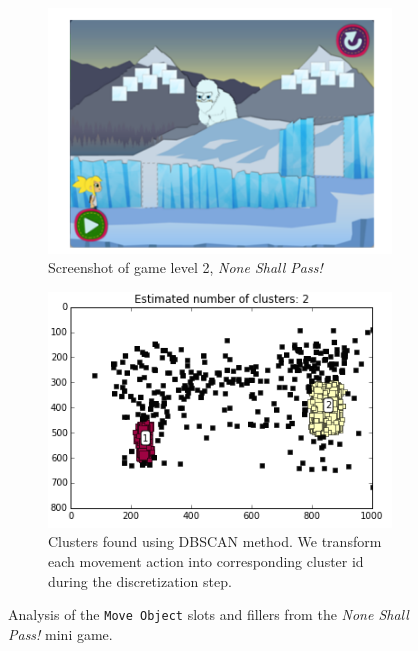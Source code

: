 \documentclass{sigchi}
\begin{document}
	\begin{figure}[ht]
		\centering
		\begin{subfigure}[t]{.5\textwidth}
			\centering
			\includegraphics[width=0.9\columnwidth]{figures/glacier_screenshot.png}
			\caption{Screenshot of game level 2, \textit {None Shall Pass!} \label{fig:screenshot}}
		\end{subfigure}
		\begin{subfigure}[t]{.5\textwidth}
			\centering
			\includegraphics[width=0.9\columnwidth]{figures/glacier_positions.png}
			\caption{Clusters found using DBSCAN method. We transform each movement action into corresponding cluster id during the discretization step. \label{fig:clustering}}
		\end{subfigure}
		\caption{Analysis of the  \texttt{Move Object} slots and fillers from the \textit{None Shall Pass!} mini game.\label{fig:figurecluster}}
	\end{figure}
	
\end{document}
